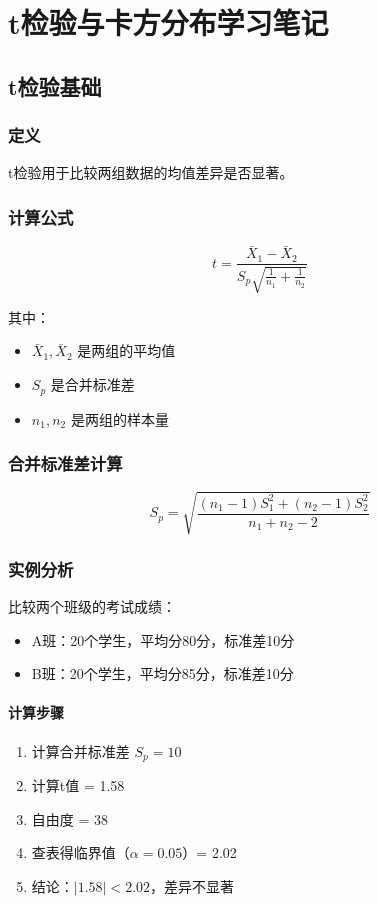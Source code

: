 \section{t检验与卡方分布学习笔记}

\subsection{t检验基础}

\subsubsection{定义}
t检验用于比较两组数据的均值差异是否显著。

\subsubsection{计算公式}
\[t = \frac{\bar{X}_1 - \bar{X}_2}{S_p\sqrt{\frac{1}{n_1}+\frac{1}{n_2}}}\]

其中：
\begin{itemize}
    \item $\bar{X}_1, \bar{X}_2$ 是两组的平均值
    \item $S_p$ 是合并标准差
    \item $n_1, n_2$ 是两组的样本量
\end{itemize}

\subsubsection{合并标准差计算}
\[S_p = \sqrt{\frac{(n_1-1)S_1^2 + (n_2-1)S_2^2}{n_1+n_2-2}}\]

\subsubsection{实例分析}
比较两个班级的考试成绩：
\begin{itemize}
    \item A班：20个学生，平均分80分，标准差10分
    \item B班：20个学生，平均分85分，标准差10分
\end{itemize}

\paragraph{计算步骤}
\begin{enumerate}
    \item 计算合并标准差 $S_p = 10$
    \item 计算t值 = 1.58
    \item 自由度 = 38
    \item 查表得临界值（$\alpha=0.05$）= 2.02
    \item 结论：$|1.58| < 2.02$，差异不显著
\end{enumerate}

